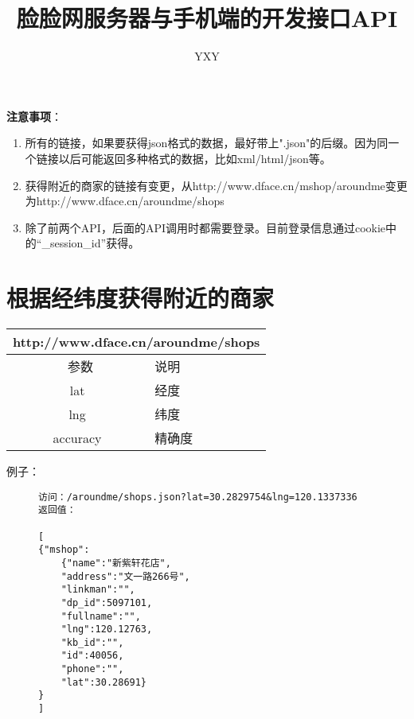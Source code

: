 \documentclass[cs4size]{ctexartutf8}
\author{YXY}
\title{脸脸网服务器与手机端的开发接口API}
\begin{document}
 

\maketitle
\tableofcontents

\newpage

\textbf{注意事项}：
\begin{enumerate}
\item 所有的链接，如果要获得json格式的数据，最好带上".json"的后缀。因为同一个链接以后可能返回多种格式的数据，比如xml/html/json等。
\item 获得附近的商家的链接有变更，从http://www.dface.cn/mshop/aroundme变更为http://www.dface.cn/aroundme/shops
\item 除了前两个API，后面的API调用时都需要登录。目前登录信息通过cookie中的“\_session\_id”获得。
\end{enumerate}

\newpage

\section{根据经纬度获得附近的商家}

\begin{table}[H]
   \begin{center}
\begin{tabular}{|c|p{12cm}|}
\hline
\multicolumn{2}{|c|}{http://www.dface.cn/aroundme/shops} \\
\hline\hline
 \  参数  &  说明  \\
\hline
 lat  &  经度\\
\hline
 lng  &  纬度\\ 
\hline
 accuracy  &  精确度\\ 
\hline
\end{tabular}
   \end{center}
\end{table}


例子：

\begin{figure}[H]
\begin{verbatim}
访问：/aroundme/shops.json?lat=30.2829754&lng=120.1337336
返回值：

[
{"mshop":
	{"name":"新紫轩花店",
	"address":"文一路266号",
	"linkman":"",
	"dp_id":5097101,
	"fullname":"",
	"lng":120.12763,
	"kb_id":"",
	"id":40056,
	"phone":"",
	"lat":30.28691}
}
]

\end{verbatim}
\end{figure}
     
\end{document}
